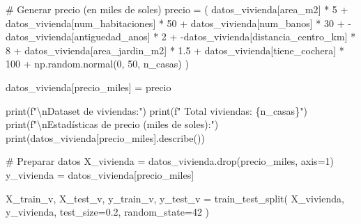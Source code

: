 \documentclass[
  doc,
  floatsintext,
  longtable,
  a4paper,
  nolmodern,
  notxfonts,
  notimes,
  12pt,
  colorlinks=true,linkcolor=blue,citecolor=blue,urlcolor=blue]{apa7}
\newenvironment{Shaded}{\begin{snugshade}}{\end{snugshade}}
\newcommand{\BuiltInTok}[1]{\textcolor[rgb]{0.00,0.23,0.31}{#1}}
\newcommand{\CharTok}[1]{\textcolor[rgb]{0.13,0.47,0.30}{#1}}
\newcommand{\CommentTok}[1]{\textcolor[rgb]{0.37,0.37,0.37}{#1}}
\newcommand{\DecValTok}[1]{\textcolor[rgb]{0.68,0.00,0.00}{#1}}
\newcommand{\FloatTok}[1]{\textcolor[rgb]{0.68,0.00,0.00}{#1}}
\newcommand{\NormalTok}[1]{\textcolor[rgb]{0.00,0.23,0.31}{#1}}
\newcommand{\OperatorTok}[1]{\textcolor[rgb]{0.37,0.37,0.37}{#1}}
\newcommand{\SpecialCharTok}[1]{\textcolor[rgb]{0.37,0.37,0.37}{#1}}
\newcommand{\SpecialStringTok}[1]{\textcolor[rgb]{0.13,0.47,0.30}{#1}}
\newcommand{\StringTok}[1]{\textcolor[rgb]{0.13,0.47,0.30}{#1}}
\begin{document}
\begin{Shaded}
\begin{Highlighting}[]
\CommentTok{\# Generar precio (en miles de soles)}
\NormalTok{precio }\OperatorTok{=}\NormalTok{ (}
\NormalTok{    datos\_vivienda[}\StringTok{\textquotesingle{}area\_m2\textquotesingle{}}\NormalTok{] }\OperatorTok{*} \DecValTok{5} \OperatorTok{+}
\NormalTok{    datos\_vivienda[}\StringTok{\textquotesingle{}num\_habitaciones\textquotesingle{}}\NormalTok{] }\OperatorTok{*} \DecValTok{50} \OperatorTok{+}
\NormalTok{    datos\_vivienda[}\StringTok{\textquotesingle{}num\_banos\textquotesingle{}}\NormalTok{] }\OperatorTok{*} \DecValTok{30} \OperatorTok{+}
    \OperatorTok{{-}}\NormalTok{datos\_vivienda[}\StringTok{\textquotesingle{}antiguedad\_anos\textquotesingle{}}\NormalTok{] }\OperatorTok{*} \DecValTok{2} \OperatorTok{+}
    \OperatorTok{{-}}\NormalTok{datos\_vivienda[}\StringTok{\textquotesingle{}distancia\_centro\_km\textquotesingle{}}\NormalTok{] }\OperatorTok{*} \DecValTok{8} \OperatorTok{+}
\NormalTok{    datos\_vivienda[}\StringTok{\textquotesingle{}area\_jardin\_m2\textquotesingle{}}\NormalTok{] }\OperatorTok{*} \FloatTok{1.5} \OperatorTok{+}
\NormalTok{    datos\_vivienda[}\StringTok{\textquotesingle{}tiene\_cochera\textquotesingle{}}\NormalTok{] }\OperatorTok{*} \DecValTok{100} \OperatorTok{+}
\NormalTok{    np.random.normal(}\DecValTok{0}\NormalTok{, }\DecValTok{50}\NormalTok{, n\_casas)}
\NormalTok{)}

\NormalTok{datos\_vivienda[}\StringTok{\textquotesingle{}precio\_miles\textquotesingle{}}\NormalTok{] }\OperatorTok{=}\NormalTok{ precio}

\BuiltInTok{print}\NormalTok{(}\SpecialStringTok{f"}\CharTok{\textbackslash{}n}\SpecialStringTok{Dataset de viviendas:"}\NormalTok{)}
\BuiltInTok{print}\NormalTok{(}\SpecialStringTok{f"  Total viviendas: }\SpecialCharTok{\{}\NormalTok{n\_casas}\SpecialCharTok{\}}\SpecialStringTok{"}\NormalTok{)}
\BuiltInTok{print}\NormalTok{(}\SpecialStringTok{f"}\CharTok{\textbackslash{}n}\SpecialStringTok{Estadísticas de precio (miles de soles):"}\NormalTok{)}
\BuiltInTok{print}\NormalTok{(datos\_vivienda[}\StringTok{\textquotesingle{}precio\_miles\textquotesingle{}}\NormalTok{].describe())}

\CommentTok{\# Preparar datos}
\NormalTok{X\_vivienda }\OperatorTok{=}\NormalTok{ datos\_vivienda.drop(}\StringTok{\textquotesingle{}precio\_miles\textquotesingle{}}\NormalTok{, axis}\OperatorTok{=}\DecValTok{1}\NormalTok{)}
\NormalTok{y\_vivienda }\OperatorTok{=}\NormalTok{ datos\_vivienda[}\StringTok{\textquotesingle{}precio\_miles\textquotesingle{}}\NormalTok{]}

\NormalTok{X\_train\_v, X\_test\_v, y\_train\_v, y\_test\_v }\OperatorTok{=}\NormalTok{ train\_test\_split(}
\NormalTok{    X\_vivienda, y\_vivienda, test\_size}\OperatorTok{=}\FloatTok{0.2}\NormalTok{, random\_state}\OperatorTok{=}\DecValTok{42}
\NormalTok{)}


\end{Highlighting}
\end{Shaded}
\end{document}

